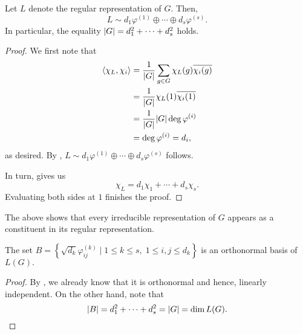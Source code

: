 \begin{prop} \label{prop:descripofL}
	Let $L$ denote the regular representation of $G.$ Then,
	\begin{equation*} 
		L \sim d_1 \varphi^{(1)} \oplus \cdots \oplus d_s \varphi^{(s)}.
	\end{equation*}
	In particular, the equality ${\left\lvert G \right\lvert} = d_1^2 + \cdots + d_s^2$ holds.
\end{prop}
\begin{proof} 
	We first note that
	\begin{align*} 
		\langle \chi_L, \chi_i\rangle &= \dfrac{1}{{\left\lvert G \right\lvert}}\sum_{g \in G} \chi_L(g)\overline{\chi_i(g)}\\
		&= \dfrac{1}{{\left\lvert G \right\lvert}}\chi_L(1)\overline{\chi_i(1)}\\
		&= \dfrac{1}{{\left\lvert G \right\lvert}}{\left\lvert G \right\lvert}\deg \varphi^{(i)}\\
		&= \deg \varphi^{(i)} = d_i,
	\end{align*}
	as desired. By , $L \sim d_1 \varphi^{(1)} \oplus \cdots \oplus d_s \varphi^{(s)}$ follows.

	In turn,  gives us
	\begin{equation*} 
		\chi_L = d_1\chi_1 + \cdots + d_s\chi_s.
	\end{equation*}
	Evaluating both sides at $1$ finishes the proof.
\end{proof}

\begin{rem} \label{rem:regrepcontainsallreps}
	The above shows that every irreducible representation of $G$ appears as a constituent in its regular representation.
\end{rem}

\begin{cor} \label{cor:orthnormalbasis}
	The set $B = \left\{\sqrt{d_k}\varphi_{ij}^{(k)} \mid 1 \le k \le s,\;1 \le i, j \le d_k\right\}$ is an orthonormal basis of $L(G).$
\end{cor}
\begin{proof}
	By , we already know that it is orthonormal and hence, linearly independent. On the other hand, note that
	\begin{equation*} 
		{\left\lvert B \right\lvert} = d_1^2 + \cdots + d_s^2 = {\left\lvert G \right\lvert} = \dim L(G). \qedhere
	\end{equation*}
\end{proof}


